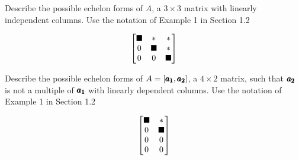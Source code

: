 \documentclass{../mathhomework}
\newenvironment{Mat}{\begin{bmatrix}}{\end{bmatrix}}
\begin{document}
\begin{problem}[1.7\#23]
    Describe the possible echelon forms of $A$, a $3 \times 3$ matrix with linearly independent columns. Use the notation of Example 1 in Section 1.2

    \begin{solution}
        \begin{align*}
            \begin{Mat}
                \blacksquare & * & * \\ 
                0 & \blacksquare & * \\
                0 & 0 & \blacksquare
            \end{Mat}
        \end{align*}
    \end{solution}
\end{problem}

\begin{problem}[1.7\#25]
    Describe the possible echelon forms of $A = [\pmb{a_1}, \pmb{a_2}]$, a $4 \times 2$ matrix, such that $\pmb{a_2}$ is not a multiple of $\pmb{a_1}$ with linearly dependent columns. Use the notation of Example 1 in Section 1.2

    \begin{solution}
        \begin{equation*}
            \begin{Mat}
                \blacksquare & * \\ 
                0 & \blacksquare \\ 
                0 & 0 \\ 
                0 & 0
            \end{Mat}
        \end{equation*}
    \end{solution}
\end{problem}
\end{document}
